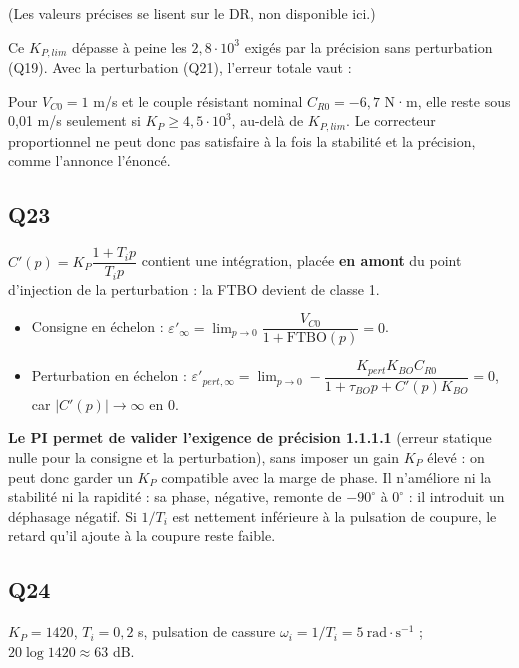\documentclass[11pt,a4paper]{article}
\providecommand{\tightlist}{\setlength{\itemsep}{0pt}\setlength{\parskip}{0pt}}
\newcommand{\equationajustee}[1]{%
  \sbox{\boiteequation}{$\displaystyle #1$}%
  \ifdim\wd\boiteequation>\linewidth
    \[\resizebox{\linewidth}{!}{\usebox{\boiteequation}}\]%
  \else
    \[#1\]%
  \fi}
\begin{document}
(Les valeurs précises se lisent sur le DR, non disponible ici.)

Ce \(K_{P,lim}\) dépasse à peine les \(2{,}8\cdot10^3\) exigés par la précision sans perturbation (Q19). Avec la perturbation (Q21), l'erreur totale vaut :

\equationajustee{\varepsilon'_{tot,\infty}=\frac{V_{C0}-K_{pert}K_{BO}C_{R0}}{1+K_PK_{BO}}}

Pour \(V_{C0}=1\) m/s et le couple résistant nominal \(C_{R0}=-6{,}7\) N·m, elle reste sous 0,01 m/s seulement si \(K_P\ge4{,}5\cdot10^3\), au-delà de \(K_{P,lim}\). Le correcteur proportionnel ne peut donc pas satisfaire à la fois la stabilité et la précision, comme l'annonce l'énoncé.

\hypertarget{q23}{%
\subsection{Q23}\label{q23}}

\(C'(p)=K_P\dfrac{1+T_ip}{T_ip}\) contient une intégration, placée \textbf{en amont} du point d'injection de la perturbation : la FTBO devient de classe 1.

\begin{itemize}
\tightlist
\item
  Consigne en échelon : \(\varepsilon'_\infty=\lim_{p\to0}\dfrac{V_{C0}}{1+\mathrm{FTBO}(p)}=0\).
\item
  Perturbation en échelon : \(\varepsilon'_{pert,\infty}=\lim_{p\to0}-\dfrac{K_{pert}K_{BO}C_{R0}}{1+\tau_{BO}p+C'(p)K_{BO}}=0\), car \(|C'(p)|\to\infty\) en 0.
\end{itemize}

\textbf{Le PI permet de valider l'exigence de précision 1.1.1.1} (erreur statique nulle pour la consigne et la perturbation), sans imposer un gain \(K_P\) élevé : on peut donc garder un \(K_P\) compatible avec la marge de phase. Il n'améliore ni la stabilité ni la rapidité : sa phase, négative, remonte de \(-90^\circ\) à \(0^\circ\) : il introduit un déphasage négatif. Si \(1/T_i\) est nettement inférieure à la pulsation de coupure, le retard qu'il ajoute à la coupure reste faible.

\hypertarget{q24}{%
\subsection{Q24}\label{q24}}

\(K_P=1420\), \(T_i=0{,}2\) s, pulsation de cassure \(\omega_i=1/T_i=5\ \mathrm{rad\cdot s^{-1}}\) ; \(20\log1420\approx63\) dB.
\end{document}
